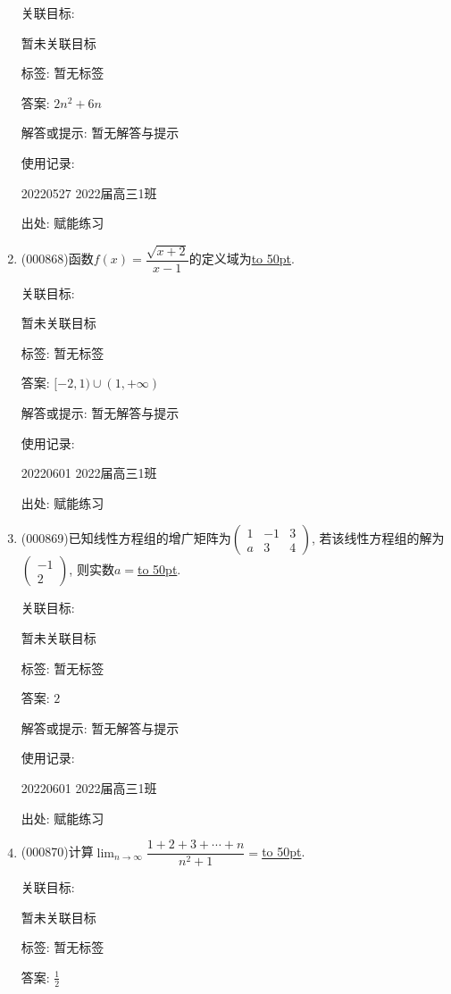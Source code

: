 \documentclass[10pt,a4paper]{article}
\newcommand{\blank}[1]{\underline{\hbox to #1pt{}}}
\begin{document}
\begin{enumerate}[1.]
关联目标:

暂未关联目标



标签: 暂无标签

答案: $2n^2+6n$

解答或提示: 暂无解答与提示

使用记录:

20220527	2022届高三1班	


出处: 赋能练习
\item { (000868)}函数$f(x)=\dfrac{\sqrt{x+2}}{x-1}$的定义域为\blank{50}.


关联目标:

暂未关联目标



标签: 暂无标签

答案: $[-2,1)\cup (1,+\infty)$

解答或提示: 暂无解答与提示

使用记录:

20220601	2022届高三1班	


出处: 赋能练习
\item { (000869)}已知线性方程组的增广矩阵为$\begin{pmatrix} 1 & -1  & 3  \\ a & 3 & 4 \end{pmatrix}$, 若该线性方程组的解为$\begin{pmatrix} -1 \\ 2\end{pmatrix}$, 则实数$a=$\blank{50}.


关联目标:

暂未关联目标



标签: 暂无标签

答案: $2$

解答或提示: 暂无解答与提示

使用记录:

20220601	2022届高三1班	


出处: 赋能练习
\item { (000870)}计算$\displaystyle\lim_{n\to\infty}\dfrac{1+2+3+\cdots +n}{n^2+1}=$\blank{50}.


关联目标:

暂未关联目标



标签: 暂无标签

答案: $\frac 12$


\end{enumerate}
\end{document}
